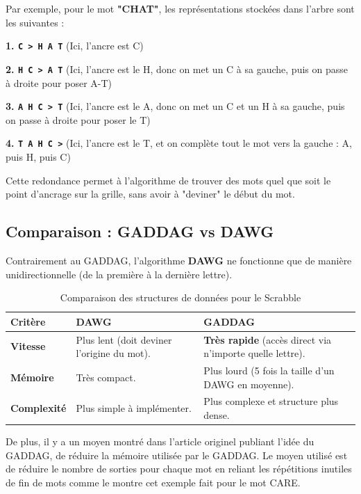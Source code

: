 \documentclass[a4paper]{article}
\begin{document}
\vspace{1\baselineskip}
\hangindent=0.8mm
Par exemple, pour le mot \textbf{"CHAT"}, les représentations stockées dans l'arbre sont les suivantes :

\hangindent=1.5cm
\textbf{1. \texttt{C > H A T}} (Ici, l'ancre est C)


\hangindent=1.5cm
\textbf{2. \texttt{H C > A T}} (Ici, l'ancre est le H, donc on met un C à sa gauche, puis on passe à droite pour poser A-T)


\hangindent=1.5cm
\textbf{3. \texttt{A H C > T}} (Ici, l'ancre est le A, donc on met un C et un H à sa gauche, puis on passe à droite pour poser le T)

\hangindent=1.5cm
\textbf{4. \texttt{T A H C >}} (Ici, l'ancre est le T, et on complète tout le mot vers la gauche : A, puis H, puis C)

\hangindent=0.8mm
Cette redondance permet à l'algorithme de trouver des mots quel que soit le point d'ancrage sur la grille, sans avoir à "deviner" le début du mot.

\subsection{Comparaison : GADDAG vs DAWG}
\hangindent=0.8mm
Contrairement au GADDAG, l'algorithme \textbf{DAWG} ne fonctionne que de manière unidirectionnelle (de la première à la dernière lettre).

\begin{table}[h!]
\centering
\begin{tabular}{|l|p{5cm}|p{5cm}|}
\hline
\textbf{Critère} & \textbf{DAWG} & \textbf{GADDAG} \\ \hline
\textbf{Vitesse} & Plus lent (doit deviner l'origine du mot). & \textbf{Très rapide} (accès direct via n'importe quelle lettre). \\ \hline
\textbf{Mémoire} & Très compact. & Plus lourd (5 fois la taille d'un DAWG en moyenne). \\ \hline
\textbf{Complexité} & Plus simple à implémenter. & Plus complexe et structure plus dense. \\ \hline
\end{tabular}
\caption{Comparaison des structures de données pour le Scrabble}
\end{table}

\hangindent=0.8mm
De plus, il y a un moyen montré dans l’article originel publiant l’idée du GADDAG, de réduire la mémoire utilisée par le GADDAG. Le moyen utilisé est de réduire le nombre de sorties pour chaque mot en reliant les répétitions inutiles de fin de mots comme le montre cet exemple fait pour le mot CARE.
\end{document}
